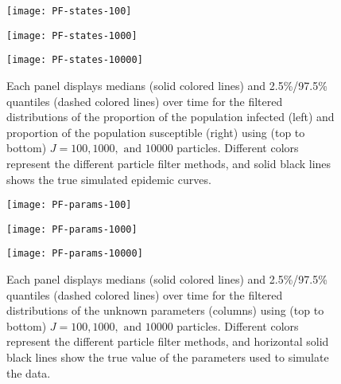 \documentclass{article}
\begin{document}
\begin{figure}[ht]
\centering
\begin{minipage}{1.0\linewidth}
\texttt{[image: PF-states-100]}
\end{minipage}
\begin{minipage}{1.0\linewidth}
\texttt{[image: PF-states-1000]}
\end{minipage}
\begin{minipage}{1.0\linewidth}
\texttt{[image: PF-states-10000]}
\end{minipage}
\caption{Each panel displays medians (solid colored lines) and 2.5\%/97.5\% quantiles (dashed colored lines) over time for the filtered distributions of the proportion of the population infected (left) and proportion of the population susceptible (right) using (top to bottom) $J = 100, 1000, \mbox{ and } 10000$ particles.  Different colors represent the different particle filter methods, and solid black lines shows the true simulated epidemic curves.} \label{fig:states}
\end{figure}

\begin{figure}[ht]
\centering
\begin{minipage}{1.1\linewidth}
\texttt{[image: PF-params-100]}
\end{minipage}
\begin{minipage}{1.1\linewidth}
\texttt{[image: PF-params-1000]}
\end{minipage}
\begin{minipage}{1.1\linewidth}
\texttt{[image: PF-params-10000]}
\end{minipage}
\caption{Each panel displays medians (solid colored lines) and 2.5\%/97.5\% quantiles (dashed colored lines) over time for the filtered distributions of the unknown parameters (columns) using (top to bottom) $J = 100, 1000, \mbox{ and } 10000$ particles.  Different colors represent the different particle filter methods, and horizontal solid black lines show the true value of the parameters used to simulate the data.} \label{fig:params}
\end{figure}
\end{document}
